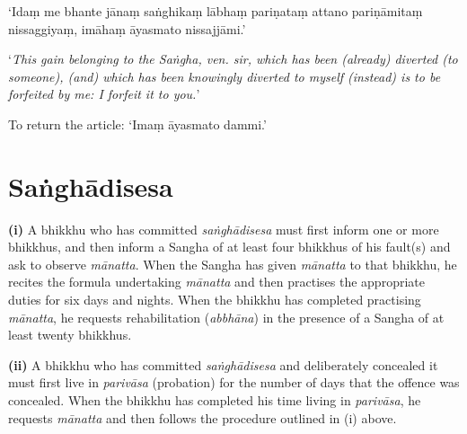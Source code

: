 ‘Idaṃ me bhante jānaṃ saṅghikaṃ lābhaṃ pariṇataṃ attano pariṇāmitaṃ nissaggiyaṃ,
imāhaṃ āyasmato nissajjāmi.’

‘\emph{This gain belonging to the Saṅgha, ven. sir, which has been (already)
  diverted (to someone), (and) which has been knowingly diverted to myself
  (instead) is to be forfeited by me: I forfeit it to you.}’


To return the article: ‘Imaṃ āyasmato dammi.’


\ifhandbookedition
\clearpage
\fi

\section{Saṅghādisesa}

\textbf{(i)} A bhikkhu who has committed \emph{saṅghādisesa} must first inform
one or more bhikkhus, and then inform a Sangha of at least four bhikkhus of his
fault(s) and ask to observe \emph{mānatta}. When the Sangha has given
\emph{mānatta} to that bhikkhu, he recites the formula undertaking
\emph{mānatta} and then practises the appropriate duties for six days and
nights. When the bhikkhu has completed practising \emph{mānatta}, he requests
rehabilitation (\emph{abbhāna}) in the presence of a Sangha of at least twenty
bhikkhus.

\textbf{(ii)} A bhikkhu who has committed \emph{saṅghādisesa} and deliberately
concealed it must first live in \emph{parivāsa} (probation) for the number of
days that the offence was concealed. When the bhikkhu has completed his time
living in \emph{parivāsa}, he requests \emph{mānatta} and then follows the
procedure outlined in (i) above.

